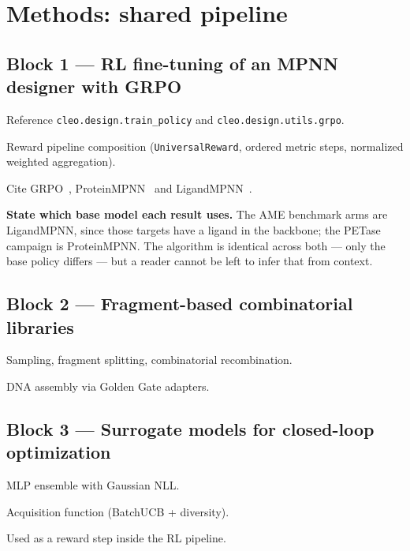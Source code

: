 \section{Methods: shared pipeline}
\label{sec:met:overview}


\subsection*{Block 1 --- RL fine-tuning of an MPNN designer with GRPO}
\begin{planlist}
  \item Reference \texttt{cleo.design.train\_policy} and
        \texttt{cleo.design.utils.grpo}.
  \item Reward pipeline composition (\texttt{UniversalReward}, ordered metric
        steps, normalized weighted aggregation).
  \item Cite GRPO~\cite{shao2024deepseekmath},
        ProteinMPNN~\cite{dauparas2022proteinmpnn} and
        LigandMPNN~\cite{dauparas2025ligandmpnn}.
  \item \textbf{State which base model each result uses.} The AME benchmark
        arms are LigandMPNN, since those targets have a ligand in the backbone;
        the PETase campaign is ProteinMPNN. The algorithm is identical across
        both --- only the base policy differs --- but a reader cannot be left to
        infer that from context.
\end{planlist}

\subsection*{Block 2 --- Fragment-based combinatorial libraries}
\begin{planlist}
  \item Sampling, fragment splitting, combinatorial recombination.
  \item DNA assembly via Golden Gate adapters.
\end{planlist}

\subsection*{Block 3 --- Surrogate models for closed-loop optimization}
\begin{planlist}
  \item MLP ensemble with Gaussian NLL.
  \item Acquisition function (BatchUCB + diversity).
  \item Used as a reward step inside the RL pipeline.
\end{planlist}

